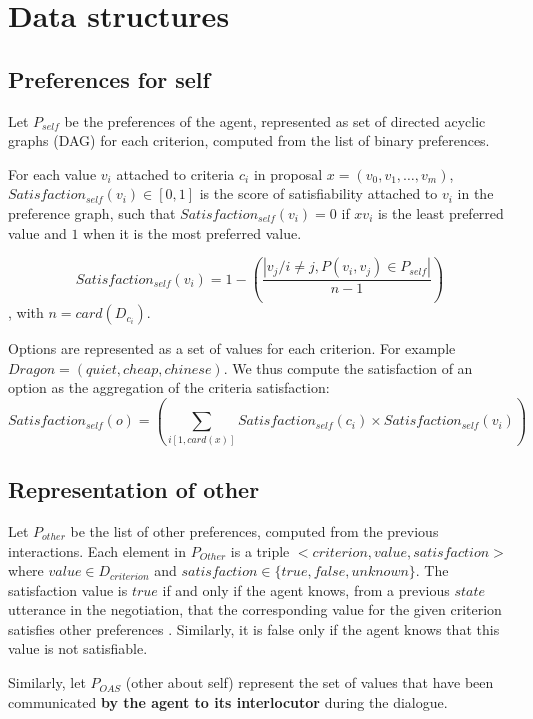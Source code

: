 \documentclass{article}
\begin{document}
		\title{\vskip -10pt}
		
		\author{Lydia Ould Ouali, Charles Rich \and
		Nicolas Sabouret }
		
	
	\section{Data structures}
	
	\subsection{Preferences for self}
	Let $P_{self}$ be the preferences of the agent, represented as set of directed acyclic graphs (DAG) for each criterion, computed from the list of binary preferences.
	
	For each value $v_i$ attached to criteria $c_i$ in proposal $x=(v_0,v_1,\ldots,v_m)$, $Satisfaction_{self}(v_i)\in[0, 1]$ is the score of satisfiability attached to $v_i$ in the preference graph, such that $Satisfaction_{self}(v_i) =0$ if $xv_i$ is the least preferred value and $1$ when it is the most preferred value.
	
	$$Satisfaction_{self}(v_i) = 1 - \left(\frac{|v_j / i \not= j, P(v_i,v_j) \in P_{self}|}{n-1}\right)$$
	, with $n=card(D_{c_i})$. 
	
	Options are represented as a set of values for each criterion. For example $Dragon=(quiet,cheap,chinese)$. We thus compute the satisfaction of an option as the aggregation  of the criteria satisfaction:  
	$$Satisfaction_{self}(o) = \left(\sum_{i[1,card(x)]} Satisfaction_{self}(c_i)\times  Satisfaction_{self}(v_i)\right)$$
	
	
	
	
	\subsection{Representation of other}
	Let $P_{other}$ be the list of other preferences, computed from the previous interactions. Each element in $P_{Other}$ is a triple $<criterion,value,satisfaction>$ where $value\in D_{criterion}$ and $satisfaction\in\{true,false,unknown\}$. The satisfaction value is $true$ if and only if the agent knows, from a previous $state$ utterance in the negotiation, that the corresponding value for the given criterion satisfies other preferences . Similarly, it is false only if the agent knows that this value is not satisfiable.
	
	Similarly, let $P_{OAS}$ (other about self) represent the set of values that have been communicated \textbf{by the agent to its interlocutor} during the dialogue.
	
\end{document}
